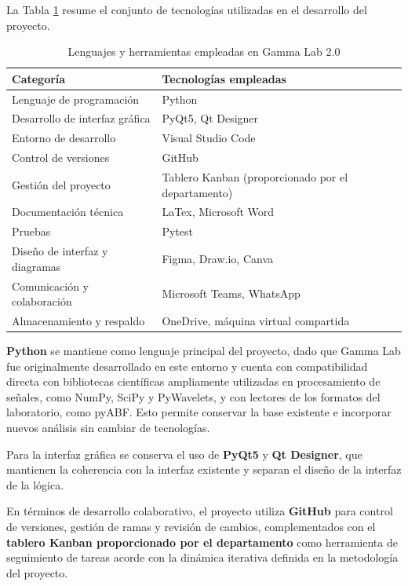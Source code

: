 \documentclass{article}
\begin{document}
La Tabla \ref{tab:herramientas_gammalab} resume el conjunto de tecnologías utilizadas en el desarrollo del proyecto.

\begin{table}[h!]
\centering
\begin{tabular}{|p{5cm}|p{7cm}|}
\hline
\textbf{Categoría} & \textbf{Tecnologías empleadas} \\
\hline
Lenguaje de programación & Python \\
\hline
Desarrollo de interfaz gráfica & PyQt5, Qt Designer \\
\hline
Entorno de desarrollo & Visual Studio Code \\
\hline
Control de versiones & GitHub \\
\hline
Gestión del proyecto & Tablero Kanban (proporcionado por el departamento) \\
\hline
Documentación técnica & LaTex, Microsoft Word \\
\hline
Pruebas & Pytest \\
\hline
Diseño de interfaz y diagramas & Figma, Draw.io, Canva \\
\hline
Comunicación y colaboración & Microsoft Teams, WhatsApp \\
\hline
Almacenamiento y respaldo & OneDrive, máquina virtual compartida \\
\hline
\end{tabular}
\caption{Lenguajes y herramientas empleadas en Gamma Lab 2.0}
\label{tab:herramientas_gammalab}
\end{table}

\textbf{Python} se mantiene como lenguaje principal del proyecto, dado que Gamma Lab fue originalmente desarrollado en este entorno y cuenta con compatibilidad directa con bibliotecas científicas ampliamente utilizadas en procesamiento de señales, como NumPy, SciPy y PyWavelets, y con lectores de los formatos del laboratorio, como pyABF. Esto permite conservar la base existente e incorporar nuevos análisis sin cambiar de tecnologías.

Para la interfaz gráfica se conserva el uso de \textbf{PyQt5} y \textbf{Qt Designer}, que mantienen la coherencia con la interfaz existente y separan el diseño de la interfaz de la lógica.

En términos de desarrollo colaborativo, el proyecto utiliza \textbf{GitHub} para control de versiones, gestión de ramas y revisión de cambios, complementados con el \textbf{tablero Kanban proporcionado por el departamento} como herramienta de seguimiento de tareas acorde con la dinámica iterativa definida en la metodología del proyecto.
\end{document}
